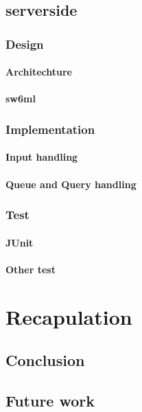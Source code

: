   \section{serverside} %
    \subsection{Design}
      \subsubsection{Architechture}
      \subsubsection{sw6ml}
    \subsection{Implementation}
      \subsubsection{Input handling}
      \subsubsection{Queue and Query handling}
    \subsection{Test}
      \subsubsection{JUnit}
      \subsubsection{Other test}

\chapter{Recapulation}
  \section{Conclusion}
  \section{Future work}

\appendix


